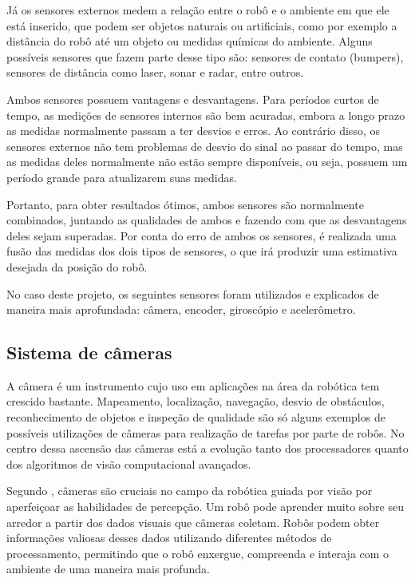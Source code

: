 \documentclass[acronym, symbols, table, deposito]{fei}
\begin{document}
			Já os sensores externos medem a relação entre o robô e o ambiente em que ele está inserido, que podem ser objetos naturais ou artificiais, como por exemplo a distância do robô até um objeto ou medidas químicas do ambiente. Alguns possíveis sensores que fazem parte desse tipo são: sensores de contato (bumpers), sensores de distância como laser, sonar e radar, entre outros.
			
			Ambos sensores possuem vantagens e desvantagens. Para períodos curtos de tempo, as medições de sensores internos são bem acuradas, embora a longo prazo as medidas normalmente passam a ter desvios e erros. Ao contrário disso, os sensores externos não tem problemas de desvio do sinal ao passar do tempo, mas as medidas deles normalmente não estão sempre disponíveis, ou seja, possuem um período grande para atualizarem suas medidas.
			
			Portanto, para obter resultados ótimos, ambos sensores são normalmente combinados, juntando as qualidades de ambos e fazendo com que as desvantagens deles sejam superadas. Por conta do erro de ambos os sensores, é realizada uma fusão das medidas dos dois tipos de sensores, o que irá produzir uma estimativa desejada da posição do robô.
			
			No caso deste projeto, os seguintes sensores foram utilizados e explicados de maneira mais aprofundada: câmera, encoder, giroscópio e acelerômetro.
			
			\subsection{Sistema de câmeras} \label{sec:sensores_cameras}
			
				A câmera é um instrumento cujo uso em aplicações na área da robótica tem crescido bastante. Mapeamento, localização, navegação, desvio de obstáculos, reconhecimento de objetos e inspeção de qualidade são só alguns exemplos de possíveis utilizações de câmeras para realização de tarefas por parte de robôs. No centro dessa ascensão das câmeras está a evolução tanto dos processadores quanto dos algoritmos de visão computacional avançados.
				
				Segundo \textcite{cameras_technexion}, câmeras são cruciais no campo da robótica guiada por visão por aperfeiçoar as habilidades de percepção. Um robô pode aprender muito sobre seu arredor a partir dos dados visuais que câmeras coletam. Robôs podem obter informações valiosas desses dados utilizando diferentes métodos de processamento, permitindo que o robô enxergue, compreenda e interaja com o ambiente de uma maneira mais profunda.
				
\end{document}

